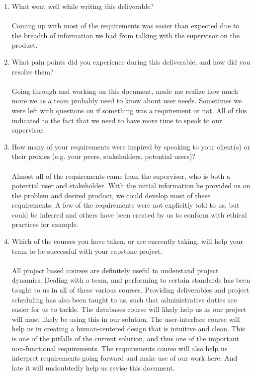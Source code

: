 \documentclass[12pt]{article}
\begin{document}
\begin{enumerate}
  \item What went well while writing this deliverable?\\\\
  Coming up with most of the requirements was easier than expected due to the breadth of information we had from talking with the supervisor on the product.
  
  
  \item What pain points did you experience during this deliverable, and how
  did you resolve them?\\\\
  Going through and working on this document, made me realize how much more we as a team probably need to know about user needs. Sometimes we were left with questions on if something was a requirement or not. All of this indicated to the fact that we need to have more time to speak to our supervisor.
  
  \item How many of your requirements were inspired by speaking to your
  client(s) or their proxies (e.g. your peers, stakeholders, potential users)?\\\\
  Almost all of the requirements came from the supervisor, who is both a potential user and stakeholder. With the initial information he provided us on the problem and desired product, we could develop most of these requirements. A few of the requirements were not explicitly told to us, but could be inferred and others have been created by us to conform with ethical practices for example.
  
  \item Which of the courses you have taken, or are currently taking, will help
  your team to be successful with your capstone project.\\\\
  All project based courses are definitely useful to understand project dynamics. Dealing with a team, and performing to certain standards has been taught to us in all of these various courses. Providing deliverables and project scheduling has also been taught to us, such that administrative duties are easier for us to tackle. The databases course will likely help us as our project will most likely be using this in our solution. The user-interface course will help us in creating a human-centered design that is intuitive and clean. This is one of the pitfalls of the current solution, and thus one of the important non-functional requirements. The requirements course will also help us interpret requirements going forward and make use of our work here. And late it will undoubtedly help us revise this document.

\end{enumerate}
\end{document}
